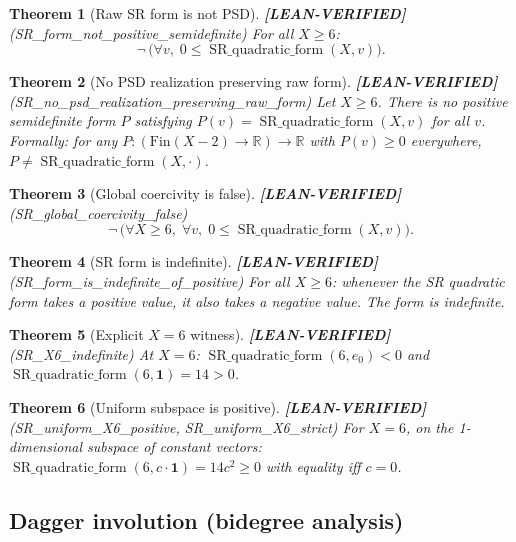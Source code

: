 \documentclass[11pt]{article}
\newtheorem{theorem}{Theorem}[section]
\theoremstyle{remark}
\newcommand{\LEANVERIFIED}{\textbf{\color{green!60!black}[LEAN-VERIFIED]}}
\begin{document}
\begin{theorem}[Raw SR form is not PSD] \LEANVERIFIED{} \textnormal{(SR\_form\_not\_positive\_semidefinite)}
For all $X \geq 6$:
\[
\neg\,\bigl(\forall v,\; 0 \leq \operatorname{SR\_quadratic\_form}(X, v)\bigr).
\]
\end{theorem}

\begin{theorem}[No PSD realization preserving raw form] \LEANVERIFIED{} \textnormal{(SR\_no\_psd\_realization\_preserving\_raw\_form)}
Let $X \geq 6$. There is no positive semidefinite form $P$ satisfying
$P(v) = \operatorname{SR\_quadratic\_form}(X, v)$ for all $v$.
Formally: for any $P : (\mathrm{Fin}(X-2) \to \mathbb{R}) \to \mathbb{R}$ with $P(v) \geq 0$ everywhere,
$P \neq \operatorname{SR\_quadratic\_form}(X, \cdot)$.
\end{theorem}

\begin{theorem}[Global coercivity is false] \LEANVERIFIED{} \textnormal{(SR\_global\_coercivity\_false)}
\[
\neg\,\bigl(\forall X \geq 6,\; \forall v,\; 0 \leq \operatorname{SR\_quadratic\_form}(X, v)\bigr).
\]
\end{theorem}

\begin{theorem}[SR form is indefinite] \LEANVERIFIED{} \textnormal{(SR\_form\_is\_indefinite\_of\_positive)}
For all $X \geq 6$: whenever the SR quadratic form takes a positive value,
it also takes a negative value. The form is indefinite.
\end{theorem}

\begin{theorem}[Explicit $X=6$ witness] \LEANVERIFIED{} \textnormal{(SR\_X6\_indefinite)}
At $X = 6$: $\operatorname{SR\_quadratic\_form}(6, e_0) < 0$ and $\operatorname{SR\_quadratic\_form}(6, \mathbf{1}) = 14 > 0$.
\end{theorem}

\begin{theorem}[Uniform subspace is positive] \LEANVERIFIED{} \textnormal{(SR\_uniform\_X6\_positive, SR\_uniform\_X6\_strict)}
For $X=6$, on the 1-dimensional subspace of constant vectors:
$\operatorname{SR\_quadratic\_form}(6, c\cdot\mathbf{1}) = 14c^2 \geq 0$ with equality iff $c=0$.
\end{theorem}

\subsection{Dagger involution (bidegree analysis)}
\end{document}
